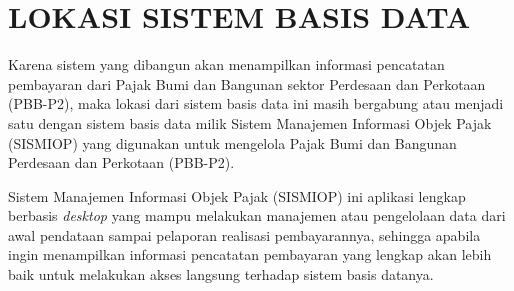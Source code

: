 \chapter{LOKASI SISTEM BASIS DATA}

Karena sistem yang dibangun akan menampilkan informasi pencatatan pembayaran dari Pajak Bumi dan Bangunan sektor Perdesaan dan Perkotaan (PBB-P2), maka lokasi dari sistem basis data ini masih bergabung atau menjadi satu dengan sistem basis data milik Sistem Manajemen Informasi Objek Pajak (SISMIOP) yang digunakan untuk mengelola Pajak Bumi dan Bangunan Perdesaan dan Perkotaan (PBB-P2).

Sistem Manajemen Informasi Objek Pajak (SISMIOP) ini aplikasi lengkap berbasis \textit{desktop} yang mampu melakukan manajemen atau pengelolaan data dari awal pendataan sampai pelaporan realisasi pembayarannya, sehingga apabila ingin menampilkan informasi pencatatan pembayaran yang lengkap akan lebih baik untuk melakukan akses langsung terhadap sistem basis datanya.